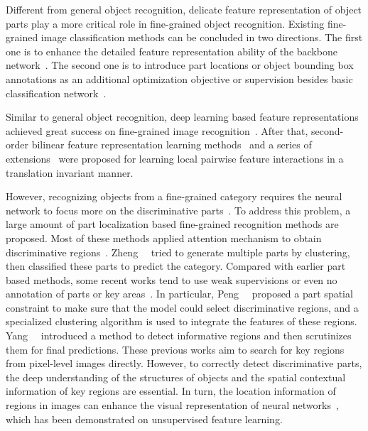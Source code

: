 \documentclass[10pt,twocolumn,letterpaper]{article}
\begin{document}
Different from general object recognition, delicate feature representation of object parts play a more critical role in fine-grained object recognition. Existing fine-grained image classification methods can be concluded in two directions. The first one is to enhance the detailed feature representation ability of the backbone network~\cite{F1, F2, F3}. The second one is to introduce part locations or object bounding box annotations as an additional optimization objective or supervision besides basic classification network~\cite{DVAN, MACNN, RACNN, CoSeq}.

Similar to general object recognition, deep learning based feature representations achieved great success on fine-grained image recognition~\cite{donahue2014decaf,sharif2014cnn}. After that, second-order bilinear feature representation learning methods~\cite{BCNN} and a series of extensions~\cite{wei2018grassmann,kong2017low,yu2018hierarchical} were proposed for learning local pairwise feature interactions in a translation invariant manner. 

However, recognizing objects from a fine-grained category requires the neural network to focus more on the discriminative parts~\cite{PARTPROVE}. To address this problem, a large amount of part localization based fine-grained recognition methods are proposed. Most of these methods applied attention mechanism to obtain discriminative regions~\cite{RACNN, MAMC}. Zheng~\etal~\cite{MACNN} tried to generate multiple parts by clustering, then classified these parts to predict the category. Compared with earlier part based methods, some recent works tend to use weak supervisions or even no annotation of parts or key areas~\cite{OPAM,yang2018learning}. In particular, Peng~\etal~\cite{OPAM} proposed a part spatial constraint to make sure that the model could select discriminative regions, and a specialized clustering algorithm is used to integrate the features of these regions. Yang~\etal~\cite{yang2018learning} introduced a method to detect informative regions and then scrutinizes them for final predictions. These previous works aim to search for key regions from pixel-level images directly. However, to correctly detect discriminative parts, the deep understanding of the structures of objects and the spatial contextual information of key regions are essential. In turn, the location information of regions in images can enhance the visual representation of neural networks~\cite{PUZZ}, which has been demonstrated on unsupervised feature learning.
\end{document}
